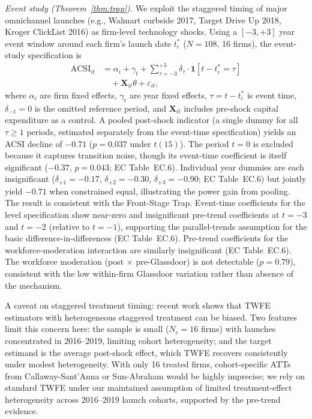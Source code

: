 \documentclass[msom,dblanonrev]{informs4}
\begin{document}
\noindent\textit{Event study (Theorem~\ref{thm:trap}).} We exploit the staggered timing of major omnichannel launches (e.g., Walmart curbside 2017, Target Drive Up 2018, Kroger ClickList 2016) as firm-level technology shocks. Using a $[-3, +3]$ year event window around each firm's launch date $t_i^*$ ($N = 108$, 16 firms), the event-study specification is
\begin{equation}\label{eq:eventstudy}
\begin{aligned}
    \mathrm{ACSI}_{it} &= \alpha_i + \gamma_t + \sum_{\tau=-3}^{+3} \delta_\tau \cdot \mathbf{1}[t - t_i^* = \tau] \\
    &\quad + \mathbf{X}_{it}\theta + \varepsilon_{it},
\end{aligned}
\end{equation}
where $\alpha_i$ are firm fixed effects, $\gamma_t$ are year fixed effects, $\tau = t - t_i^*$ is event time, $\delta_{-1} = 0$ is the omitted reference period, and $\mathbf{X}_{it}$ includes pre-shock capital expenditure as a control. A pooled post-shock indicator (a single dummy for all $\tau \geq 1$ periods, estimated separately from the event-time specification) yields an ACSI decline of $-0.71$ ($p = 0.037$ under $t(15)$). The period $t{=}0$ is excluded because it captures transition noise, though its event-time coefficient is itself significant ($-0.37$, $p = 0.043$; EC Table~EC.6). Individual year dummies are each insignificant ($\delta_{+1}{=}{-}0.17$, $\delta_{+2}{=}{-}0.30$, $\delta_{+3}{=}{-}0.90$; EC Table~EC.6) but jointly yield $-0.71$ when constrained equal, illustrating the power gain from pooling. The result is consistent with the Front-Stage Trap. Event-time coefficients for the level specification show near-zero and insignificant pre-trend coefficients at $t = -3$ and $t = -2$ (relative to $t = -1$), supporting the parallel-trends assumption for the basic difference-in-differences (EC Table~EC.6). Pre-trend coefficients for the workforce-moderation interaction are similarly insignificant (EC Table~EC.6). The workforce moderation (post $\times$ pre-Glassdoor) is not detectable ($p = 0.79$), consistent with the low within-firm Glassdoor variation rather than absence of the mechanism.

A caveat on staggered treatment timing: recent work \citep{callaway2021difference, sun2021estimating} shows that TWFE estimators with heterogeneous staggered treatment can be biased. Two features limit this concern here: the sample is small ($N_c = 16$ firms) with launches concentrated in 2016--2019, limiting cohort heterogeneity; and the target estimand is the average post-shock effect, which TWFE recovers consistently under modest heterogeneity. With only 16 treated firms, cohort-specific ATTs from Callaway-Sant'Anna or Sun-Abraham would be highly imprecise; we rely on standard TWFE under our maintained assumption of limited treatment-effect heterogeneity across 2016--2019 launch cohorts, supported by the pre-trend evidence.
\end{document}
